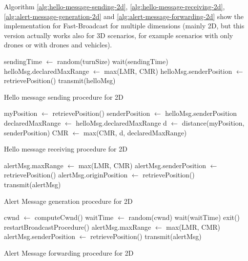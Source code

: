 		Algorithm \ref{alg:hello-message-sending-2d}, \ref{alg:hello-message-receiving-2d}, \ref{alg:alert-message-generation-2d} and \ref{alg:alert-message-forwarding-2d} show the implementation for Fast-Broadcast for multiple dimensions (mainly 2D, but this version actually works also for 3D scenarios, for example scenarios with only drones or with drones and vehicles).
		
		\begin{algorithm}[H]
			\begin{algorithmic}[1]
				\State sendingTime $\gets$ random(turnSize)
				\State wait(sendingTime)
				\State helloMsg.declaredMaxRange $\gets$ max(LMR, CMR)
				\State helloMsg.senderPosition $\gets$ retrievePosition()
				\State transmit(helloMsg)
				\EndIf
				\EndFor
			\end{algorithmic}
			\caption{Hello message sending procedure for 2D}
			\label{alg:hello-message-sending-2d}
		\end{algorithm}
		
		\begin{algorithm}[H]
			\begin{algorithmic}[1]
				\State myPosition $\gets$ retrievePosition()
				\State senderPosition $\gets$ helloMsg.senderPosition
				\State declaredMaxRange $\gets$ helloMsg.declaredMaxRange
				\State d $\gets$ distance(myPosition, senderPosition)
				\State CMR $\gets$ max(CMR, d, declaredMaxRange)
			\end{algorithmic}
			\caption{Hello message receiving procedure for 2D}
			\label{alg:hello-message-receiving-2d}
		\end{algorithm}
	
	
		\begin{algorithm}[H]
			\begin{algorithmic}[1]
				\State alertMsg.maxRange $\gets$ max(LMR, CMR)
				\State alertMsg.senderPosition $\gets$ retrievePosition()
				\State alertMsg.originPosition $\gets$ retrievePosition()
				\State transmit(alertMsg)
			\end{algorithmic}
			\caption{Alert Message generation procedure for 2D}
			\label{alg:alert-message-generation-2d}
		\end{algorithm}
	
		\begin{algorithm}[H]
			\begin{algorithmic}[1]
				\State cwnd $\gets$ computeCwnd()
				\State waitTime $\gets$ random(cwnd)
				\State wait(waitTime)
				\State exit()
				\State restartBroadcastProcedure()
				\Else 
				\State alertMsg.maxRange $\gets$ max(LMR, CMR)
				\State alertMsg.senderPosition $\gets$ retrievePosition()
				\State transmit(alertMsg)
				\EndIf 
			\end{algorithmic}
			\caption{Alert Message forwarding procedure for 2D}
			\label{alg:alert-message-forwarding-2d}
		\end{algorithm}
	
